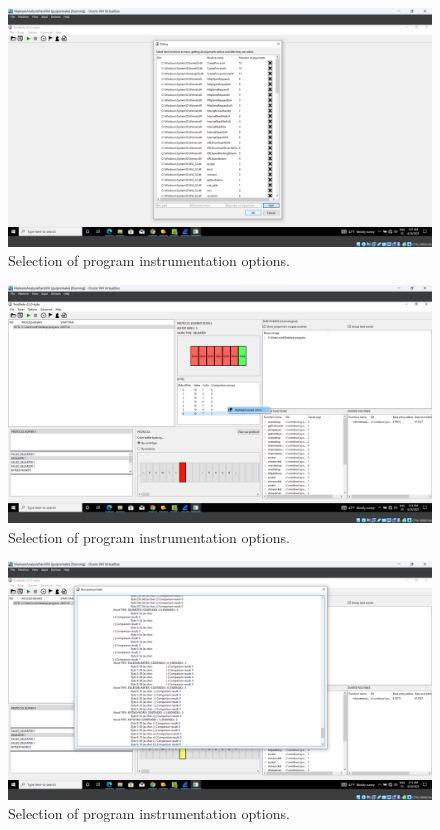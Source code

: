 \documentclass[conference]{IEEEtran}
\begin{document}
\begin{figure}[htbp]
    \centerline{\includegraphics[width=1.0\columnwidth]{images/sch_s3.png}}
    \caption{Selection of program instrumentation options.}
    \label{figure:ap_sch_s3}
\end{figure}

\begin{figure}[htbp]
    \centerline{\includegraphics[width=1.0\columnwidth]{images/sch_s5.png}}
    \caption{Selection of program instrumentation options.}
    \label{figure:ap_sch_s5}
\end{figure}

\begin{figure}[htbp]
    \centerline{\includegraphics[width=1.0\columnwidth]{images/sch_s6.png}}
    \caption{Selection of program instrumentation options.}
    \label{figure:ap_sch_s6}
\end{figure}
\end{document}
